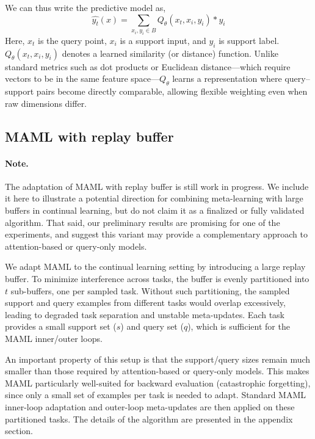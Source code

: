 \documentclass{article}
\begin{document}
We can thus write the predictive model as,
\begin{equation}
\hat{y_t}(x) = {\sum\limits_{x_i , y_i\in B} Q_\theta(x_t, x_i, y_i) * y_i}
\label{eq:query_based_model}     
\end{equation}
Here, $x_t$ is the query point, $x_i$ is a support input, and $y_i$ is support label.
$Q_\theta(x_t, x_i, y_i)$ denotes a learned similarity (or distance) function.
Unlike standard metrics such as dot products or Euclidean distance—which require vectors to be in the same feature space—$Q_\theta$ learns a representation where query–support pairs become directly comparable, allowing flexible weighting even when raw dimensions differ.

\subsection{MAML with replay buffer}
\paragraph{Note.} 
The adaptation of MAML with replay buffer is still work in progress. 
We include it here to illustrate a potential direction for combining meta-learning with large 
buffers in continual learning, but do not claim it as a finalized or fully validated algorithm. 
That said, our preliminary results are promising for one of the experiments, and suggest this variant may provide 
a complementary approach to attention-based or query-only models.  

We adapt MAML to the continual learning setting by introducing a large replay buffer. 
To minimize interference across tasks, the buffer is evenly partitioned into $t$ sub-buffers, 
one per sampled task. Without such partitioning, the sampled support and query examples 
from different tasks would overlap excessively, leading to degraded task separation 
and unstable meta-updates. Each task provides a small support set ($s$) and query set ($q$), 
which is sufficient for the MAML inner/outer loops.  

An important property of this setup is that the support/query sizes remain much smaller 
than those required by attention-based or query-only models. This makes MAML particularly 
well-suited for backward evaluation (catastrophic forgetting), since only a small set of 
examples per task is needed to adapt. Standard MAML inner-loop adaptation and outer-loop 
meta-updates are then applied on these partitioned tasks.  
The details of the algorithm are presented in the appendix section.
\end{document}
